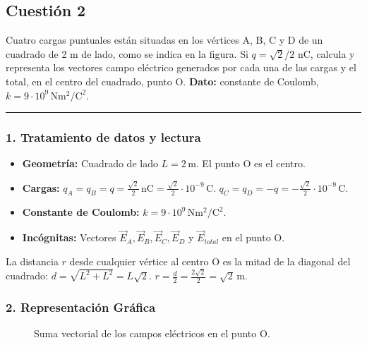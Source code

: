 \newpage
\subsection{Cuestión 2}
\label{subsec:C2_2021_jul_ext}

\begin{cajaenunciado}
Cuatro cargas puntuales están situadas en los vértices A, B, C y D de un cuadrado de 2 m de lado, como se indica en la figura. Si $q=\sqrt{2}/2$ nC, calcula y representa los vectores campo eléctrico generados por cada una de las cargas y el total, en el centro del cuadrado, punto O.
\textbf{Dato:} constante de Coulomb, $k=9\cdot10^{9}\,\text{N}\text{m}^2/\text{C}^2$.
\end{cajaenunciado}
\hrule

\subsubsection*{1. Tratamiento de datos y lectura}
\begin{itemize}
    \item \textbf{Geometría:} Cuadrado de lado $L = 2 \, \text{m}$. El punto O es el centro.
    \item \textbf{Cargas:} $q_A = q_B = q = \frac{\sqrt{2}}{2} \, \text{nC} = \frac{\sqrt{2}}{2} \cdot 10^{-9} \, \text{C}$.
    $q_C = q_D = -q = -\frac{\sqrt{2}}{2} \cdot 10^{-9} \, \text{C}$.
    \item \textbf{Constante de Coulomb:} $k = 9 \cdot 10^9 \, \text{N}\text{m}^2/\text{C}^2$.
    \item \textbf{Incógnitas:} Vectores $\vec{E}_A, \vec{E}_B, \vec{E}_C, \vec{E}_D$ y $\vec{E}_{total}$ en el punto O.
\end{itemize}
La distancia $r$ desde cualquier vértice al centro O es la mitad de la diagonal del cuadrado: $d = \sqrt{L^2+L^2} = L\sqrt{2}$.
$r = \frac{d}{2} = \frac{2\sqrt{2}}{2} = \sqrt{2} \, \text{m}$.

\subsubsection*{2. Representación Gráfica}
\begin{figure}[H]
    \centering
    \caption{Suma vectorial de los campos eléctricos en el punto O.}
\end{figure}

